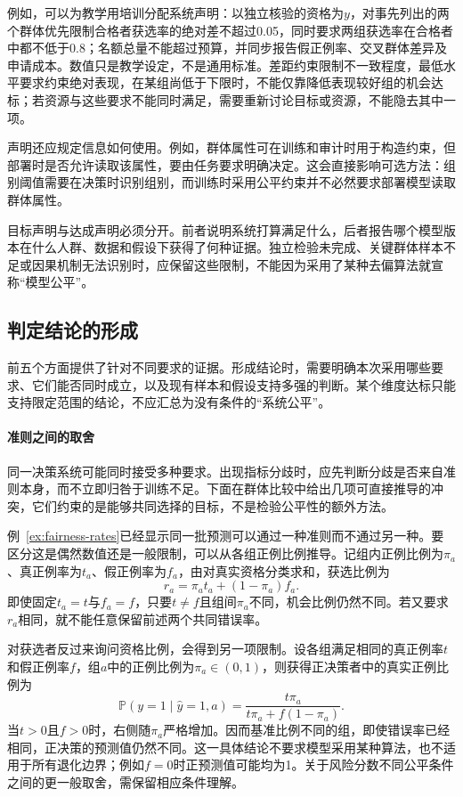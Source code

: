 例如，可以为教学用培训分配系统声明：以独立核验的资格为$y$，对事先列出的两个群体优先限制合格者获选率的绝对差不超过0.05，同时要求两组获选率在合格者中都不低于0.8；名额总量不能超过预算，并同步报告假正例率、交叉群体差异及申请成本。数值只是教学设定，不是通用标准。差距约束限制不一致程度，最低水平要求约束绝对表现，在某组尚低于下限时，不能仅靠降低表现较好组的机会达标；若资源与这些要求不能同时满足，需要重新讨论目标或资源，不能隐去其中一项。

声明还应规定信息如何使用。例如，群体属性可在训练和审计时用于构造约束，但部署时是否允许读取该属性，要由任务要求明确决定。这会直接影响可选方法：组别阈值需要在决策时识别组别，而训练时采用公平约束并不必然要求部署模型读取群体属性。

目标声明与达成声明必须分开。前者说明系统打算满足什么，后者报告哪个模型版本在什么人群、数据和假设下获得了何种证据。独立检验未完成、关键群体样本不足或因果机制无法识别时，应保留这些限制，不能因为采用了某种去偏算法就宣称“模型公平”。

\subsection{判定结论的形成}
\label{sec:fairness-compatibility}
\label{sec:fairness-evidence}

前五个方面提供了针对不同要求的证据。形成结论时，需要明确本次采用哪些要求、它们能否同时成立，以及现有样本和假设支持多强的判断。某个维度达标只能支持限定范围的结论，不应汇总为没有条件的“系统公平”。

\paragraph{准则之间的取舍}

同一决策系统可能同时接受多种要求。出现指标分歧时，应先判断分歧是否来自准则本身，而不立即归咎于训练不足。下面在群体比较中给出几项可直接推导的冲突，它们约束的是能够共同选择的目标，不是检验公平性的额外方法。

例~\ref{ex:fairness-rates}已经显示同一批预测可以通过一种准则而不通过另一种。要区分这是偶然数值还是一般限制，可以从各组正例比例推导。记组内正例比例为$\pi_a$、真正例率为$t_a$、假正例率为$f_a$，由对真实资格分类求和，获选比例为
\[
 r_a=\pi_a t_a+(1-\pi_a)f_a.
\]
即使固定$t_a=t$与$f_a=f$，只要$t\ne f$且组间$\pi_a$不同，机会比例仍然不同。若又要求$r_a$相同，就不能任意保留前述两个共同错误率。

对获选者反过来询问资格比例，会得到另一项限制。设各组满足相同的真正例率$t$和假正例率$f$，组$a$中的正例比例为$\pi_a\in(0,1)$，则获得正决策者中的真实正例比例为
\begin{equation}
 \mathbb P(y=1\mid\hat y=1,a)
 =\frac{t\pi_a}{t\pi_a+f(1-\pi_a)}.
 \label{eq:fairness-predictive-value}
\end{equation}
当$t>0$且$f>0$时，右侧随$\pi_a$严格增加。因而基准比例不同的组，即使错误率已经相同，正决策的预测值仍然不同。这一具体结论不要求模型采用某种算法，也不适用于所有退化边界；例如$f=0$时正预测值可能均为1。关于风险分数不同公平条件之间的更一般取舍，需保留相应条件理解。

